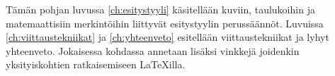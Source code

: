 Tämän pohjan luvussa \ref{ch:esitystyyli} käsitellään kuviin, taulukoihin ja matemaattisiin merkintöihin liittyvät esitystyylin perussäännöt. Luvuissa \ref{ch:viittaustekniikat} ja \ref{ch:yhteenveto} esitellään viittaustekniikat ja lyhyt yhteenveto. Jokaisessa kohdassa annetaan lisäksi vinkkejä joidenkin yksityiskohtien ratkaisemiseen \LaTeX{}illa.
